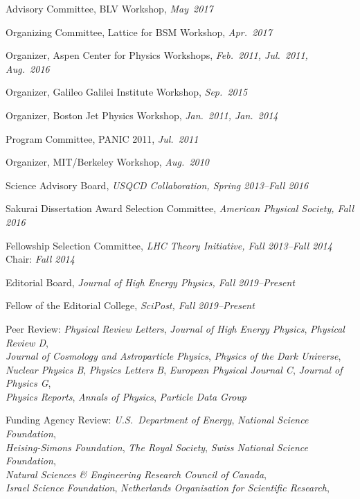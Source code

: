 \documentclass[11pt]{article}
\newcommand{\sh}{\phantom{.....}}
\begin{document}
\item Advisory Committee, BLV Workshop, \textit{May~2017}
\item Organizing Committee, Lattice for BSM Workshop, \textit{Apr.~2017}
\item Organizer, Aspen Center for Physics Workshops, \textit{Feb.~2011, Jul.~2011, Aug.~2016}
\item Organizer, Galileo Galilei Institute Workshop, \textit{Sep.~2015}
\item Organizer, Boston Jet Physics Workshop, \textit{Jan.~2011, Jan.~2014}
\item Program Committee, PANIC 2011, \textit{Jul.~2011}
\item Organizer, MIT/Berkeley Workshop, \textit{Aug.~2010}
\item Science Advisory Board, \textit{USQCD Collaboration, Spring 2013--Fall 2016}
\item Sakurai Dissertation Award Selection Committee, \textit{American Physical Society, Fall 2016}
\item Fellowship Selection Committee, \textit{LHC Theory Initiative, Fall 2013--Fall 2014}
\\ \sh Chair: \textit{Fall 2014}
\item Editorial Board, \textit{Journal of High Energy Physics, Fall 2019--Present}
\item Fellow of the Editorial College, \textit{SciPost, Fall 2019--Present}
\item Peer Review:  \textit{Physical Review Letters}, \textit{Journal of High Energy Physics}, \textit{Physical Review D},
\\ \sh \textit{Journal of Cosmology and Astroparticle Physics}, \textit{Physics of the Dark Universe},
\\ \sh \textit{Nuclear Physics B}, \textit{Physics Letters B}, \textit{European Physical Journal C}, \textit{Journal of Physics G},
\\ \sh \textit{Physics Reports}, \textit{Annals of Physics}, \textit{Particle Data Group}
\item Funding Agency Review:  \textit{U.S.~Department of Energy},  \textit{National Science Foundation},
\\ \sh \textit{Heising-Simons Foundation}, \textit{The Royal Society}, \textit{Swiss National Science Foundation},
\\ \sh \textit{Natural Sciences \& Engineering Research Council of Canada},
\\ \sh  \textit{Israel Science Foundation}, \textit{Netherlands Organisation for Scientific Research},
\end{document}

